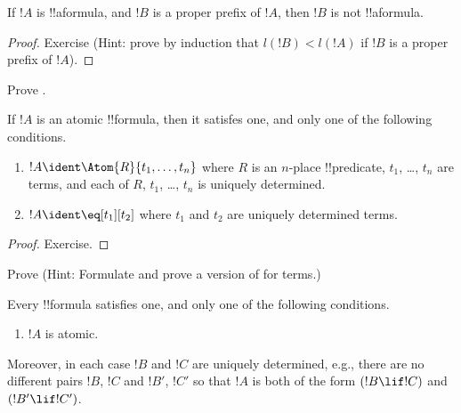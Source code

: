 \documentclass[../../include/open-logic-section]{subfiles}
\begin{document}
\begin{lem}
If $!A$ is !!a{formula}, and $!B$ is a proper prefix of $!A$, then
$!B$ is not !!a{formula}.
\end{lem}

\begin{proof}
Exercise (Hint: prove by induction that $l(!B) < l(!A)$ if $!B$ is a
proper prefix of $!A$).
\end{proof}

\begin{prob}
Prove .
\end{prob}

\begin{prop}
If $!A$ is an atomic !!{formula}, then it satisfes one, and only one
of the following conditions.
\begin{enumerate}
\item $!A \ident \Atom{R}{t_1,\dots,t_n}$ where $R$ is an $n$-place
  !!{predicate}, $t_1$, \dots, $t_n$ are terms, and each of $R$,
  $t_1$, \dots, $t_n$ is uniquely determined.
\item $!A \ident \eq[t_1][t_2]$ where $t_1$ and $t_2$ are uniquely
  determined terms.
\end{enumerate}
\end{prop}

\begin{proof}
Exercise.
\end{proof}

\begin{prob}
Prove  (Hint: Formulate and
prove a version of  for terms.)
\end{prob}

\begin{prop}
Every !!{formula} satisfies one, and only one of the following conditions.
\begin{enumerate}
\item $!A$ is atomic.







\end{enumerate}
Moreover, in each case $!B$ and $!C$ are uniquely determined, e.g.,
there are no different pairs $!B$, $!C$ and $!B'$, $!C'$ so that $!A$
is both of the form $(!B \lif !C)$ and $(!B' \lif !C')$.
\end{prop}
\end{document}
